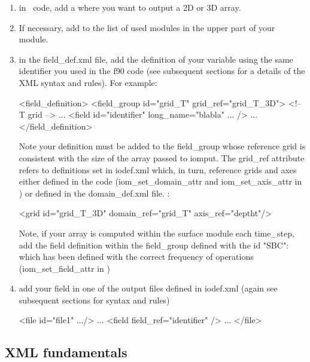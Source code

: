 \documentclass[../main/NEMO_manual]{subfiles}
\begin{document}
\begin{enumerate}
\item in \NEMO\ code, add a  where you want to output a 2D or 3D array.
\item If necessary, add  to the list of used modules in
  the upper part of your module.
\item in the field\_def.xml file, add the definition of your variable using the same identifier you used in the f90 code
  (see subsequent sections for a details of the XML syntax and rules).
  For example:
\begin{xmllines}
<field_definition>
	<field_group id="grid_T" grid_ref="grid_T_3D"> <!-- T grid -->
	...
		<field id="identifier" long_name="blabla" ... />
		...
</field_definition>
\end{xmllines}
Note your definition must be added to the field\_group whose reference grid is consistent with the size of
the array passed to iomput.
The grid\_ref attribute refers to definitions set in iodef.xml which, in turn,
reference grids and axes either defined in the code
(iom\_set\_domain\_attr and iom\_set\_axis\_attr in ) or defined in the domain\_def.xml file.
\eg:
\begin{xmllines}
<grid id="grid_T_3D" domain_ref="grid_T" axis_ref="deptht"/>
\end{xmllines}
Note, if your array is computed within the surface module each  time\_step,
add the field definition within the field\_group defined with the id "SBC":
 which has been defined with the correct frequency of operations
(iom\_set\_field\_attr in )
\item add your field in one of the output files defined in iodef.xml
  (again see subsequent sections for syntax and rules)
\begin{xmllines}
<file id="file1" .../>
...
	<field field_ref="identifier" />
	...
</file>
\end{xmllines}
\end{enumerate}

\subsection{XML fundamentals}

\end{document}
